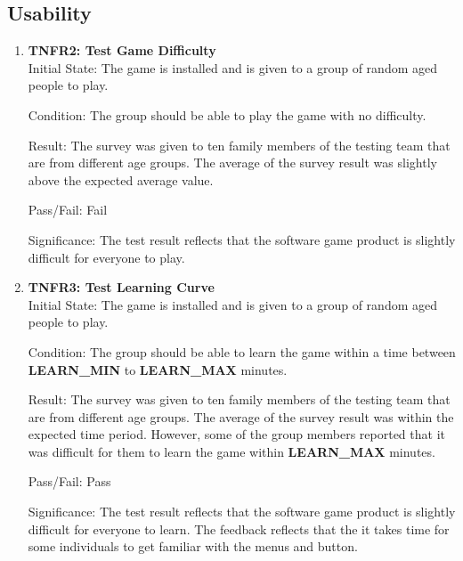 \documentclass[12pt, titlepage]{article}
\begin{document}
\subsection{Usability}
\begin{enumerate}

\item{\textbf{TNFR2: Test Game Difficulty \\}}
Initial State: The game is installed and is given to a group of random aged people to play.

Condition: The group should be able to play the game with no difficulty.

Result: The survey was given to ten family members of the testing team that are from different age groups. The average of the survey result was slightly above the expected average value.

Pass/Fail: Fail

Significance: The test result reflects that the software game product is slightly difficult for everyone to play. 

\item{\textbf{TNFR3: Test Learning Curve \\}}
Initial State: The game is installed and is given to a group of random aged people to play.

Condition: The group should be able to learn the game within a time between \textbf{LEARN\_MIN} to \textbf{LEARN\_MAX} minutes.

Result: The survey was given to ten family members of the testing team that are from different age groups. The average of the survey result was within the expected time period. However, some of the group members reported that it was difficult for them to learn the game within \textbf{LEARN\_MAX} minutes.

Pass/Fail: Pass

Significance: The test result reflects that the software game product is slightly difficult for everyone to learn. The feedback reflects that the it takes time for some individuals to get familiar with the menus and button.

\end{enumerate}
\end{document}

